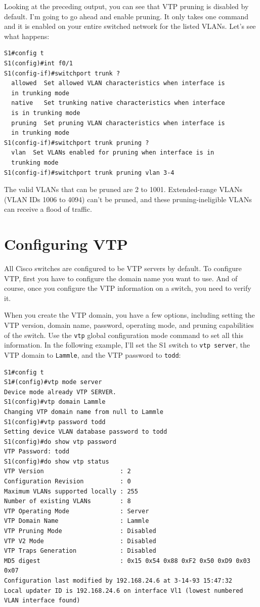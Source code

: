 Looking at the preceding output, you can see that VTP pruning is
disabled by default. I'm going to go ahead and enable pruning. It only
takes one command and it is enabled on your entire switched network for
the listed VLANs. Let's see what happens:

\begin{verbatim}
S1#config t
S1(config)#int f0/1
S1(config-if)#switchport trunk ?
  allowed  Set allowed VLAN characteristics when interface is
  in trunking mode
  native   Set trunking native characteristics when interface
  is in trunking mode
  pruning  Set pruning VLAN characteristics when interface is
  in trunking mode
S1(config-if)#switchport trunk pruning ?
  vlan  Set VLANs enabled for pruning when interface is in
  trunking mode
S1(config-if)#switchport trunk pruning vlan 3-4
\end{verbatim}

The valid VLANs that can be pruned are 2 to 1001. Extended-range VLANs
(VLAN IDs 1006 to 4094) can't be pruned, and these pruning-ineligible
VLANs can receive a flood of traffic.

\section{Configuring VTP}

All Cisco switches are configured to be VTP servers by default. To
configure VTP, first you have to configure the domain name you want to
use. And of course, once you configure the VTP information on a switch,
you need to verify it.

When you create the VTP domain, you have a few options, including
setting the VTP version, domain name, password, operating mode, and
pruning capabilities of the switch. Use the \texttt{vtp} global
configuration mode command to set all this information. In the following
example, I'll set the S1 switch to \texttt{vtp\ server}, the VTP domain
to \texttt{Lammle}, and the VTP password to \texttt{todd}:

\begin{verbatim}
S1#config t
S1#(config)#vtp mode server
Device mode already VTP SERVER.
S1(config)#vtp domain Lammle
Changing VTP domain name from null to Lammle
S1(config)#vtp password todd
Setting device VLAN database password to todd
S1(config)#do show vtp password
VTP Password: todd
S1(config)#do show vtp status
VTP Version                     : 2
Configuration Revision          : 0
Maximum VLANs supported locally : 255
Number of existing VLANs        : 8
VTP Operating Mode              : Server
VTP Domain Name                 : Lammle
VTP Pruning Mode                : Disabled
VTP V2 Mode                     : Disabled
VTP Traps Generation            : Disabled
MD5 digest                      : 0x15 0x54 0x88 0xF2 0x50 0xD9 0x03 0x07
Configuration last modified by 192.168.24.6 at 3-14-93 15:47:32
Local updater ID is 192.168.24.6 on interface Vl1 (lowest numbered VLAN interface found)
\end{verbatim}

